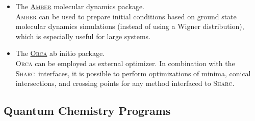 \documentclass[a4paper,10pt,DIV=15,openany]{scrbook}
\newcommand{\link}[2]{\href{#1}{#2}}
\newcommand{\sharc}{\textsc{Sharc}}
\begin{document}
\begin{itemize}
  \medskip
  \item The \link{http://ambermd.org/}{\textsc{Amber}} molecular dynamics package.
  \\
  \textsc{Amber} can be used to prepare initial conditions based on ground state molecular dynamics simulations (instead of using a Wigner distribution), which is especially useful for large systems.
  \medskip
  \item  The \link{https://orcaforum.kofo.mpg.de}{\textsc{Orca}} ab initio package.
  \\
  \textsc{Orca} can be employed as external optimizer. In combination with the \sharc\ interfaces, it is possible to perform optimizations of minima, conical intersections, and crossing points for any method interfaced to \sharc.
\end{itemize}




\subsection{Quantum Chemistry Programs}
\end{document}
